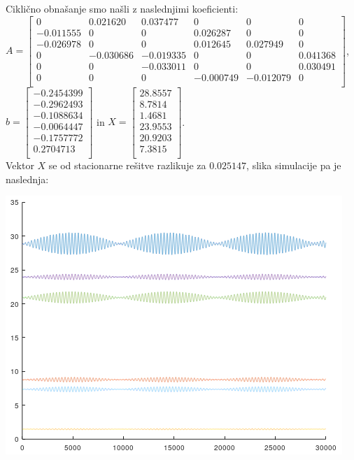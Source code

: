 \documentclass[a4paper, 12pt]{article}
\begin{document}
Ciklično obnašanje smo našli z naslednjimi koeficienti:\\
$ A =
\begin{bmatrix}
	0 & 0.021620 & 0.037477 & 0 & 0 & 0 \\
	-0.011555 & 0 & 0 & 0.026287 & 0 & 0 \\
	-0.026978 & 0 & 0 & 0.012645 & 0.027949 & 0 \\
	0 & -0.030686 & -0.019335 & 0 & 0 & 0.041368 \\
	0 & 0 & -0.033011 & 0 & 0 & 0.030491 \\
	0 & 0 & 0 & -0.000749 & -0.012079 & 0 \\
\end{bmatrix} $, 
$ b =
\begin{bmatrix}
	-0.2454399 \\
	-0.2962493 \\
	-0.1088634 \\
	-0.0064447 \\
	-0.1757772 \\
	0.2704713 \\
\end{bmatrix} $ in
$ X =
\begin{bmatrix}
	28.8557 \\
	8.7814 \\
	1.4681 \\
	23.9553 \\
	20.9203 \\
	7.3815 \\
\end{bmatrix} $. \\
Vektor $ X $ se od stacionarne rešitve razlikuje za $ 0.025147 $, slika simulacije pa je naslednja:
\begin{center}
	\includegraphics{cycle.png}
\end{center}
\end{document}
